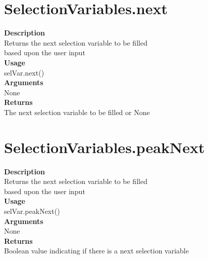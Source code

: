 \documentclass[11pt, oneside]{article}
\begin{document}

\section{SelectionVariables.next}

\textbf{Description} \\
        Returns the next selection variable to be filled \\
        based upon the user input\\

\noindent\textbf{Usage} \\
        selVar.next() \\

\noindent\textbf{Arguments} \\
        None\\

\noindent\textbf{Returns} \\
        The next selection variable to be filled or None\\


\section{SelectionVariables.peakNext}

\textbf{Description} \\
        Returns the next selection variable to be filled\\
        based upon the user input\\

\noindent\textbf{Usage} \\
        selVar.peakNext() \\

\noindent\textbf{Arguments} \\
        None\\

\noindent\textbf{Returns} \\
        Boolean value indicating if there is a next selection variable\\

\end{document}
